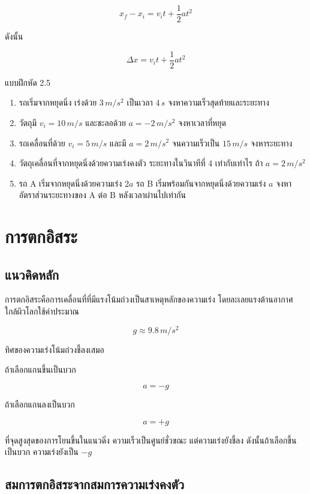 \[
x_f-x_i=v_it+\frac{1}{2}at^2
\]

ดังนั้น

\[
\Delta x=v_it+\frac{1}{2}at^2
\]

\begin{exercisebox}{แบบฝึกหัด 2.5}
\begin{enumerate}
    \item รถเริ่มจากหยุดนิ่ง เร่งด้วย $3\,\si{m/s^2}$ เป็นเวลา $4\,\si{s}$ จงหาความเร็วสุดท้ายและระยะทาง
    \item วัตถุมี $v_i=10\,\si{m/s}$ และชะลอด้วย $a=-2\,\si{m/s^2}$ จงหาเวลาที่หยุด
    \item รถเคลื่อนที่ด้วย $v_i=5\,\si{m/s}$ และมี $a=2\,\si{m/s^2}$ จนความเร็วเป็น $15\,\si{m/s}$ จงหาระยะทาง
    \item วัตถุเคลื่อนที่จากหยุดนิ่งด้วยความเร่งคงตัว ระยะทางในวินาทีที่ 4 เท่ากับเท่าไร ถ้า $a=2\,\si{m/s^2}$
    \item รถ A เริ่มจากหยุดนิ่งด้วยความเร่ง $2a$ รถ B เริ่มพร้อมกันจากหยุดนิ่งด้วยความเร่ง $a$ จงหาอัตราส่วนระยะทางของ A ต่อ B หลังเวลาผ่านไปเท่ากัน
\end{enumerate}
\end{exercisebox}

\section{การตกอิสระ}

\subsection{แนวคิดหลัก}

การตกอิสระคือการเคลื่อนที่ที่มีแรงโน้มถ่วงเป็นสาเหตุหลักของความเร่ง โดยละเลยแรงต้านอากาศ ใกล้ผิวโลกใช้ค่าประมาณ

\[
g\approx 9.8\,\si{m/s^2}
\]

ทิศของความเร่งโน้มถ่วงชี้ลงเสมอ

ถ้าเลือกแกนขึ้นเป็นบวก

\[
a=-g
\]

ถ้าเลือกแกนลงเป็นบวก

\[
a=+g
\]

\begin{tcolorbox}[title=จุดสำคัญ]
ที่จุดสูงสุดของการโยนขึ้นในแนวดิ่ง ความเร็วเป็นศูนย์ชั่วขณะ แต่ความเร่งยังชี้ลง ดังนั้นถ้าเลือกขึ้นเป็นบวก ความเร่งยังเป็น $-g$
\end{tcolorbox}

\subsection{สมการตกอิสระจากสมการความเร่งคงตัว}


